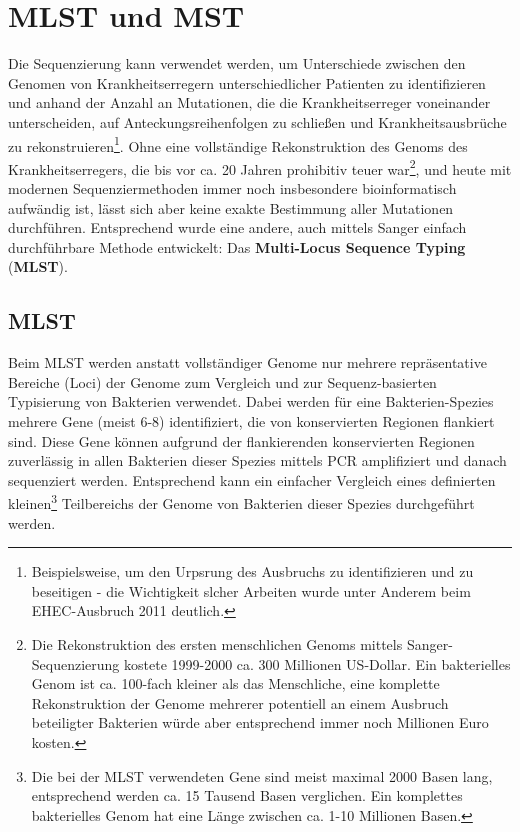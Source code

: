 \section{MLST und MST}

Die Sequenzierung kann verwendet werden, um Unterschiede zwischen den Genomen von Krankheitserregern unterschiedlicher Patienten zu identifizieren und anhand der Anzahl an Mutationen, die die Krankheitserreger voneinander unterscheiden, auf Anteckungsreihenfolgen zu schließen und Krankheitsausbrüche zu rekonstruieren\footnote{Beispielsweise, um den Urpsrung des Ausbruchs zu identifizieren und zu beseitigen - die Wichtigkeit slcher Arbeiten wurde unter Anderem beim EHEC-Ausbruch 2011 deutlich.}. Ohne eine vollständige Rekonstruktion des Genoms des Krankheitserregers, die bis vor ca. 20 Jahren prohibitiv teuer war\footnote{Die Rekonstruktion des ersten menschlichen Genoms mittels Sanger-Sequenzierung kostete 1999-2000 ca. 300 Millionen US-Dollar. Ein bakterielles Genom ist ca. 100-fach kleiner als das Menschliche, eine komplette Rekonstruktion der Genome mehrerer potentiell an einem Ausbruch beteiligter Bakterien würde aber entsprechend immer noch Millionen Euro kosten.}, und heute mit modernen Sequenziermethoden immer noch insbesondere bioinformatisch aufwändig ist, lässt sich aber keine exakte Bestimmung aller Mutationen durchführen. Entsprechend wurde eine andere, auch mittels Sanger einfach durchführbare Methode entwickelt: Das \textbf{Multi-Locus Sequence Typing} (\textbf{MLST}).

\subsection{MLST}

Beim MLST werden anstatt vollständiger Genome nur mehrere repräsentative Bereiche (Loci) der Genome zum Vergleich und zur Sequenz-basierten Typisierung von Bakterien verwendet. Dabei werden für eine Bakterien-Spezies mehrere Gene (meist 6-8) identifiziert, die von konservierten Regionen flankiert sind. Diese Gene können aufgrund der flankierenden konservierten Regionen zuverlässig in allen Bakterien dieser Spezies mittels PCR amplifiziert und danach sequenziert werden. Entsprechend kann ein einfacher Vergleich eines definierten kleinen\footnote{Die bei der MLST verwendeten Gene sind meist maximal 2000 Basen lang, entsprechend werden ca. 15 Tausend Basen verglichen. Ein komplettes bakterielles Genom hat eine Länge zwischen ca. 1-10 Millionen Basen.} Teilbereichs der Genome von Bakterien dieser Spezies durchgeführt werden.  

